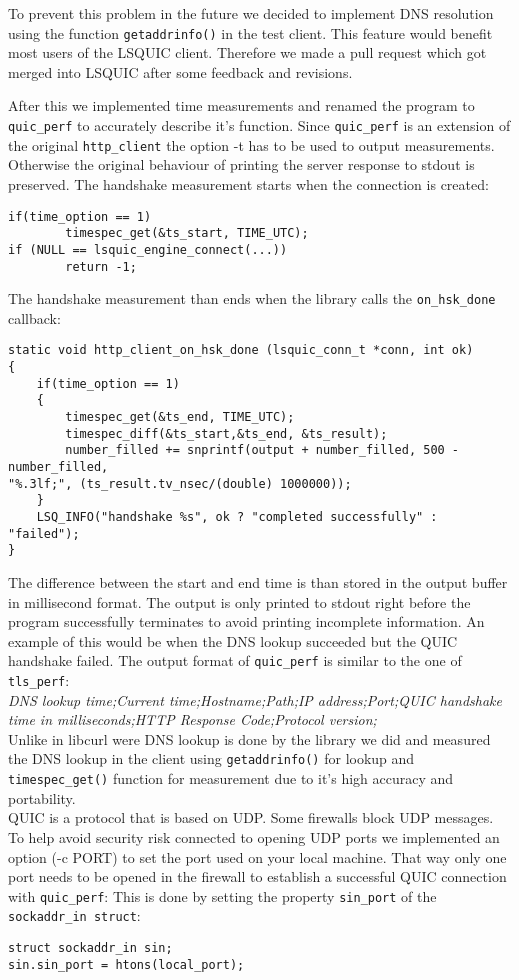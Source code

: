 To prevent this problem in the future we decided to implement DNS resolution using the function \verb|getaddrinfo()| in the test client.
This feature would benefit most users of the LSQUIC client. 
Therefore we made a pull request which got merged into LSQUIC after some feedback and revisions. \cite{Link:LSQUICpullrequest}

After this we implemented time measurements and renamed the program to \texttt{quic\_perf} to accurately describe it's function.
Since \texttt{quic\_perf} is an extension of the original \texttt{http\_client} the option -t has to be used to output measurements.
Otherwise the original behaviour of printing the server response to stdout is preserved.
The handshake measurement starts when the connection is created:
\begin{lstlisting}
if(time_option == 1)
        timespec_get(&ts_start, TIME_UTC);
if (NULL == lsquic_engine_connect(...))
        return -1;
\end{lstlisting}
The handshake measurement than ends when the library calls the \texttt{on\_hsk\_done} callback:
\begin{lstlisting}
static void http_client_on_hsk_done (lsquic_conn_t *conn, int ok)
{
    if(time_option == 1)
    {
        timespec_get(&ts_end, TIME_UTC);
        timespec_diff(&ts_start,&ts_end, &ts_result);
        number_filled += snprintf(output + number_filled, 500 - number_filled,
"%.3lf;", (ts_result.tv_nsec/(double) 1000000));
    }
    LSQ_INFO("handshake %s", ok ? "completed successfully" : "failed");
}
\end{lstlisting}
The difference between the start and end time is than stored in the output buffer in millisecond format.
The output is only printed to stdout right before the program successfully terminates to avoid printing incomplete information.
An example of this would be when the DNS lookup succeeded but the QUIC handshake failed.
The output format of \texttt{quic\_perf} is similar to the one of  \texttt{tls\_perf}:\\

\textit{DNS lookup time;Current time;Hostname;Path;IP address;Port;QUIC handshake time in milliseconds;HTTP Response Code;Protocol version;}\\

Unlike in libcurl were DNS lookup is done by the library we did and measured the DNS lookup in the client using \verb|getaddrinfo()| for lookup and \verb|timespec_get()| function for measurement due to it's high accuracy and portability.\\
QUIC is a protocol that is based on UDP. Some firewalls block UDP messages. 
To help avoid security risk connected to opening UDP ports we implemented an option (-c PORT) to set the port used on your local machine.
That way only one port needs to be opened in the firewall to establish a successful QUIC connection with \texttt{quic\_perf}:
This is done by setting the property \verb|sin_port| of the \verb|sockaddr_in struct|:
\begin{lstlisting}
struct sockaddr_in sin;
sin.sin_port = htons(local_port);
\end{lstlisting}

